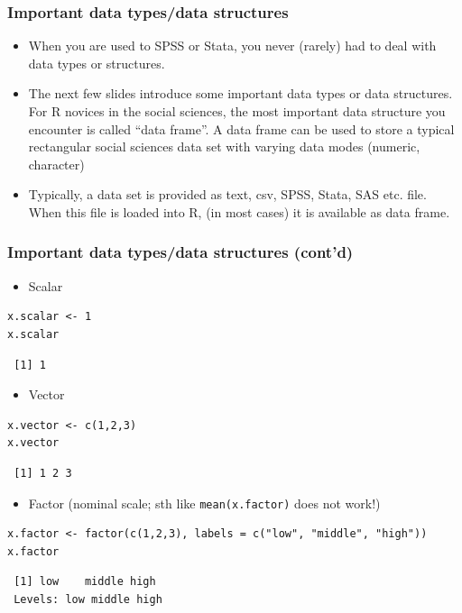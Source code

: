 \documentclass[bigger]{beamer}
\begin{document}
\begin{frame}
\frametitle{Important data types/data structures}
\label{sec-1-1-13}

\begin{itemize}
\item When you are used to SPSS or Stata, you never (rarely) had to deal with
      data types or structures.
\item The next few slides introduce some important data types or data
      structures. For R novices in the social sciences, the most important data
      structure you encounter is called \enquote{data frame}. A data frame can
      be used to store a typical rectangular social sciences data set with
      varying data modes (numeric, character)
\item Typically, a data set is provided as text, csv, SPSS, Stata, SAS
      etc. file. When this file is loaded into R, (in most cases) it is available as data
      frame.
\end{itemize}
\end{frame}
\begin{frame}[fragile,shrink = 15]
\frametitle{Important data types/data structures (cont'd)}
\label{sec-1-1-14}

\begin{itemize}
\item Scalar
\end{itemize}

\lstset{language=R}
\begin{lstlisting}
x.scalar <- 1
x.scalar
\end{lstlisting}

\begin{verbatim}
 [1] 1
\end{verbatim}


\begin{itemize}
\item Vector
\end{itemize}

\lstset{language=R}
\begin{lstlisting}
x.vector <- c(1,2,3)
x.vector
\end{lstlisting}

\begin{verbatim}
 [1] 1 2 3
\end{verbatim}

\begin{itemize}
\item Factor (nominal scale; sth like \texttt{mean(x.factor)} does not work!)
\end{itemize}

\lstset{language=R}
\begin{lstlisting}
x.factor <- factor(c(1,2,3), labels = c("low", "middle", "high"))
x.factor
\end{lstlisting}

\begin{verbatim}
 [1] low    middle high  
 Levels: low middle high
\end{verbatim}


\end{frame}
\end{document}
